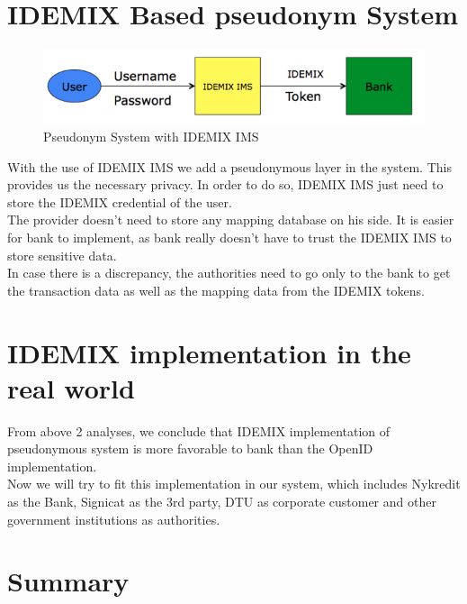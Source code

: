 \section{IDEMIX Based pseudonym System}
\begin{figure}[h]
	\centering
	\includegraphics[width=\textwidth]{figures/IDEMIX}
	\caption{Pseudonym System with IDEMIX IMS}
	\label{fig:IDEMIX}
\end{figure}
With the use of IDEMIX IMS we add a pseudonymous layer in the system. This provides us the necessary privacy. In order to do so, IDEMIX IMS just need to store the IDEMIX credential of the user. 
\\The provider doesn’t need to store any mapping database on his side. It is easier for bank to implement, as bank really doesn’t have to trust the IDEMIX IMS to store sensitive data.
\\In case there is a discrepancy, the authorities need to go only to the bank to get the transaction data as well as the mapping data from the IDEMIX tokens.
\section {IDEMIX implementation in the real world}
From above 2 analyses, we conclude that IDEMIX implementation of pseudonymous system is more favorable to bank than the OpenID implementation. 
\\Now we will try to fit this implementation in our system, which includes Nykredit as the Bank, Signicat as the 3rd party, DTU as corporate customer and other government institutions as authorities. 
\section{Summary}
